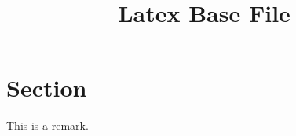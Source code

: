 
\title{Latex Base File}
\maketitle\tableofcontents
\section{Section}
\begin{remark}
  This is a remark.
\end{remark}
\vfil

